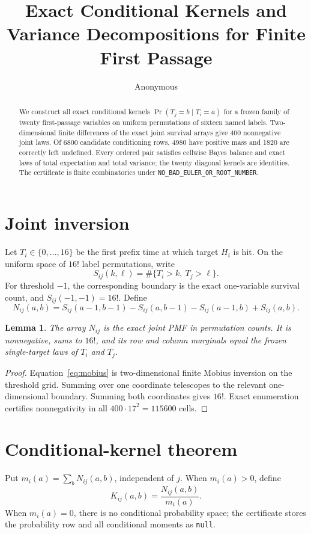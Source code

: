 \documentclass[10pt]{article}
\title{Exact Conditional Kernels and Variance Decompositions for Finite First Passage}
\author{Anonymous}
\date{}
\newtheorem{lemma}{Lemma}
\begin{document}
\maketitle

\begin{abstract}
We construct all exact conditional kernels $\Pr(T_j=b\mid T_i=a)$ for a
frozen family of twenty first-passage variables on uniform permutations of
sixteen named labels.  Two-dimensional finite differences of the exact joint
survival arrays give 400 nonnegative joint laws.  Of 6800 candidate
conditioning rows, 4980 have positive mass and 1820 are correctly left
undefined.  Every ordered pair satisfies cellwise Bayes balance and exact
laws of total expectation and total variance; the twenty diagonal kernels are
identities.  The certificate is finite combinatorics under
\texttt{NO\_BAD\_EULER\_OR\_ROOT\_NUMBER}.
\end{abstract}

\section{Joint inversion}
Let $T_i\in\{0,\ldots,16\}$ be the first prefix time at which target $H_i$ is
hit.  On the uniform space of $16!$ label permutations, write
\[
 S_{ij}(k,\ell)=\#\{T_i>k,\ T_j>\ell\}.
\]
For threshold $-1$, the corresponding boundary is the exact one-variable
survival count, and $S_{ij}(-1,-1)=16!$.  Define
\begin{equation}
 N_{ij}(a,b)=S_{ij}(a-1,b-1)-S_{ij}(a,b-1)
              -S_{ij}(a-1,b)+S_{ij}(a,b).
 \label{eq:mobius}
\end{equation}

\begin{lemma}
The array $N_{ij}$ is the exact joint PMF in permutation counts.  It is
nonnegative, sums to $16!$, and its row and column marginals equal the frozen
single-target laws of $T_i$ and $T_j$.
\end{lemma}
\begin{proof}
Equation~\eqref{eq:mobius} is two-dimensional finite Mobius inversion on the
threshold grid.  Summing over one coordinate telescopes to the relevant
one-dimensional boundary.  Summing both coordinates gives $16!$.  Exact
enumeration certifies nonnegativity in all $400\cdot17^2=115600$ cells.
\end{proof}

\section{Conditional-kernel theorem}
Put $m_i(a)=\sum_bN_{ij}(a,b)$, independent of $j$.  When $m_i(a)>0$, define
\[
 K_{ij}(a,b)=\frac{N_{ij}(a,b)}{m_i(a)}.
\]
When $m_i(a)=0$, there is no conditional probability space; the certificate
stores the probability row and all conditional moments as \texttt{null}.
\end{document}
